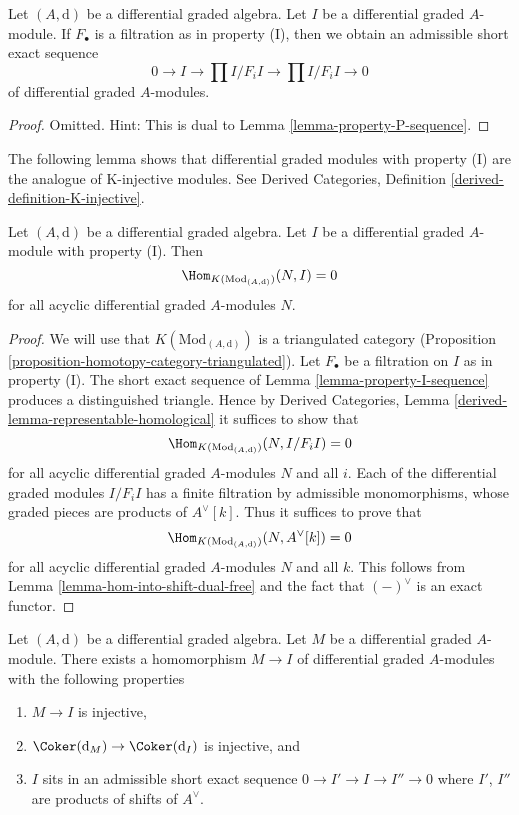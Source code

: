 \begin{lemma}
\label{lemma-property-I-sequence}
Let $(A, \text{d})$ be a differential graded algebra.
Let $I$ be a differential graded $A$-module. If $F_\bullet$
is a filtration as in property (I), then we obtain an
admissible short exact sequence
$$
0 \to I \to
\prod\nolimits I/F_iI \to
\prod\nolimits I/F_iI \to 0
$$
of differential graded $A$-modules.
\end{lemma}

\begin{proof}
Omitted. Hint: This is dual to Lemma \ref{lemma-property-P-sequence}.
\end{proof}

\noindent
The following lemma shows that differential graded modules with
property (I) are the analogue of K-injective modules. See
Derived Categories, Definition \ref{derived-definition-K-injective}.

\begin{lemma}
\label{lemma-property-I-K-injective}
Let $(A, \text{d})$ be a differential graded algebra.
Let $I$ be a differential graded $A$-module with property (I).
Then
$$
\Hom_{K(\text{Mod}_{(A, \text{d})})}(N, I) = 0
$$
for all acyclic differential graded $A$-modules $N$.
\end{lemma}

\begin{proof}
We will use that $K(\text{Mod}_{(A, \text{d})})$ is a triangulated
category (Proposition \ref{proposition-homotopy-category-triangulated}).
Let $F_\bullet$ be a filtration on $I$ as in property (I).
The short exact sequence of Lemma \ref{lemma-property-I-sequence}
produces a distinguished triangle. Hence by
Derived Categories, Lemma \ref{derived-lemma-representable-homological}
it suffices to show that
$$
\Hom_{K(\text{Mod}_{(A, \text{d})})}(N, I/F_iI) = 0
$$
for all acyclic differential graded $A$-modules $N$ and all $i$.
Each of the differential graded modules $I/F_iI$ has a finite filtration
by admissible monomorphisms, whose graded pieces are
products of $A^\vee[k]$. Thus it suffices to prove that
$$
\Hom_{K(\text{Mod}_{(A, \text{d})})}(N, A^\vee[k]) = 0
$$
for all acyclic differential graded $A$-modules $N$ and all $k$.
This follows from Lemma \ref{lemma-hom-into-shift-dual-free}
and the fact that $(-)^\vee$ is an exact functor.
\end{proof}

\begin{lemma}
\label{lemma-good-sub}
Let $(A, \text{d})$ be a differential graded algebra.
Let $M$ be a differential graded $A$-module. There exists a homomorphism
$M \to I$ of differential graded $A$-modules with the following
properties
\begin{enumerate}
\item $M \to I$ is injective,
\item $\Coker(\text{d}_M) \to \Coker(\text{d}_I)$ is injective,
and
\item $I$ sits in an admissible short exact sequence
$0 \to I' \to I \to I'' \to 0$ where $I'$, $I''$ are products
of shifts of $A^\vee$.
\end{enumerate}
\end{lemma}

